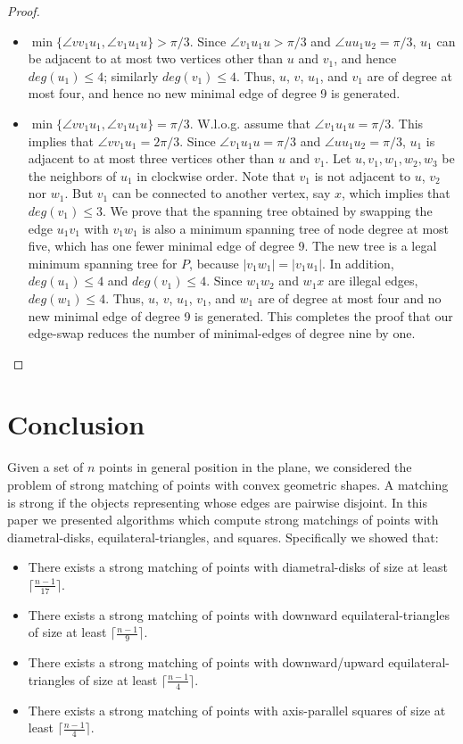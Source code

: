\documentclass[11pt,a4paper]{article}
\newcommand{\dg}[1]{deg(#1)}
\begin{document}
\begin{proof}
\begin{itemize}
 \item $\min\{\angle vv_1u_1, \angle v_1u_1u\} > \pi/3$. Since $\angle v_1u_1u>\pi/3$ and $\angle uu_1u_2= \pi/3$, $u_1$ can be adjacent to at most two vertices other than $u$ and $v_1$, and hence $\dg{u_1}\le 4$; similarly $\dg{v_1}\le 4$. Thus, $u$, $v$, $u_1$, and $v_1$ are of degree at most four, and hence no new minimal edge of degree 9 is generated.

  \item $\min\{\angle vv_1u_1, \angle v_1u_1u\} = \pi/3$. W.l.o.g. assume that $\angle v_1u_1u=\pi/3$. This implies that $\angle vv_1u_1= 2\pi/3$. Since $\angle v_1u_1u=\pi/3$ and $\angle uu_1u_2= \pi/3$, $u_1$ is adjacent to at most three vertices other than $u$ and $v_1$. Let $u,v_1, w_1,w_2,w_3$ be the neighbors of $u_1$ in clockwise order. Note that $v_1$ is not adjacent to $u$, $v_2$ nor $w_1$. But $v_1$ can be connected to another vertex, say $x$, which implies that $\dg{v_1}\le 3$. We prove that the spanning tree obtained by swapping the edge $u_1v_1$ with $v_1w_1$ is also a minimum spanning tree of node degree at most five, which has one fewer minimal edge of degree 9. The new tree is a legal minimum spanning tree for $P$, because $|v_1w_1|=|v_1u_1|$. In addition, $\dg{u_1}\le 4$ and $\dg{v_1}\le 4$. Since $w_1w_2$ and $w_1x$ are illegal edges, $\dg{w_1}\le 4$. Thus, $u$, $v$, $u_1$, $v_1$, and $w_1$ are of degree at most four and no new minimal edge of degree 9 is generated. This completes the proof that our edge-swap reduces the number of minimal-edges of degree nine by one.
\end{itemize}
\end{proof}

\section{Conclusion}
\label{conclusion}

Given a set of $n$ points in general position in the plane, we considered the problem of strong matching of points with convex geometric shapes. A matching is strong if the objects representing whose edges are pairwise disjoint. In this paper we presented algorithms which compute strong matchings of points with diametral-disks, equilateral-triangles, and squares. Specifically we showed that:
\begin{itemize}
 \item There exists a strong matching of points with diametral-disks of size at least $\lceil\frac{n-1}{17}\rceil$.
 \item There exists a strong matching of points with downward equilateral-triangles of size at least $\lceil\frac{n-1}{9}\rceil$.
\item There exists a strong matching of points with downward/upward equilateral-triangles of size at least $\lceil\frac{n-1}{4}\rceil$.
\item There exists a strong matching of points with axis-parallel squares of size at least $\lceil\frac{n-1}{4}\rceil$.
\end{itemize}
 
\end{document}
